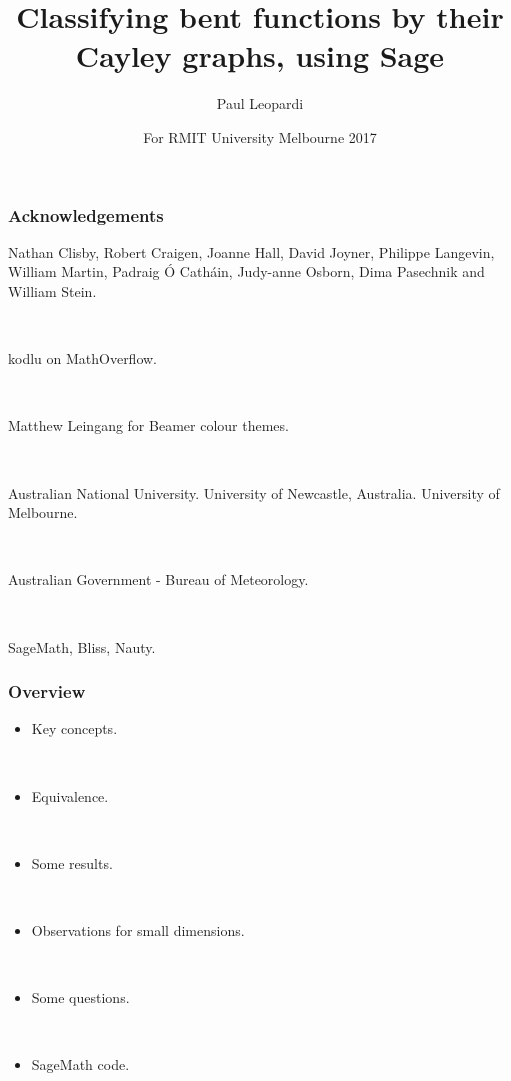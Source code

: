 \documentclass[pdf,sprung,slideColor,nocolorBG]{beamer}
\title{Classifying bent functions by their Cayley graphs, using Sage}
\author{Paul Leopardi}
\date{For RMIT University Melbourne 2017}
\institute{University of Melbourne
\\
Australian Government - Bureau of Meteorology}
\begin{document}
\frame{\titlepage}
\begin{frame}
\frametitle{Acknowledgements}
\begin{center}
Nathan Clisby,
Robert Craigen,
Joanne Hall,
David Joyner, Philippe Langevin, William Martin,
Padraig {\'O} Cath{\'a}in,
Judy-anne Osborn, Dima Pasechnik and William Stein.

~

kodlu on MathOverflow.

~

Matthew Leingang for Beamer colour themes.

~

Australian National University. University of Newcastle, Australia. University of Melbourne.

~

Australian Government - Bureau of Meteorology.

~

SageMath, Bliss, Nauty.
\end{center}
\end{frame}

\begin{frame}
\frametitle{Overview}
\begin{itemize}
\item
Key concepts.

~

\item
Equivalence.

~

\item
Some results.

~

\item
Observations for small dimensions.

~

\item
Some questions.

~

\item
SageMath code.
\end{itemize}

\end{frame}
\end{document}
